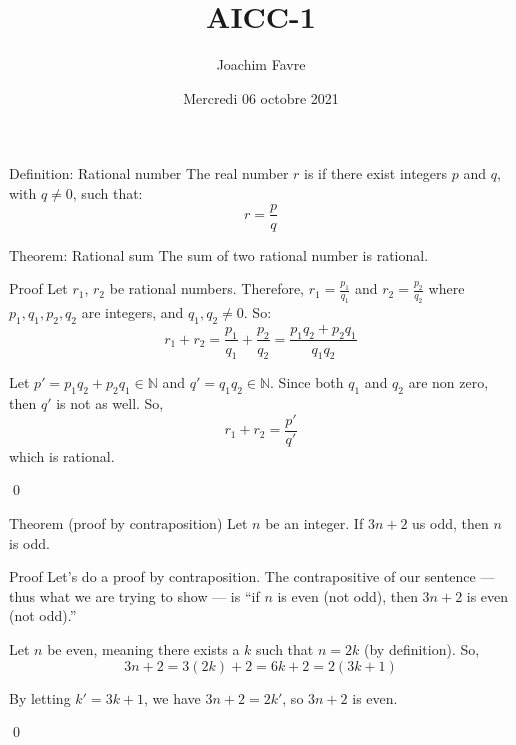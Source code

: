 \documentclass{article}
\title{AICC-1}
\author{Joachim Favre}
\date{Mercredi 06 octobre 2021}
\begin{document}
\maketitle


\begin{parag}{Definition: Rational number}
    The real number $r$ is  if there exist integers $p$ and $q$, with $q \neq 0$, such that: 
    \[r = \frac{p}{q}\]
\end{parag}

\begin{parag}{Theorem: Rational sum}
    The sum of two rational number is rational.

    \begin{subparag}{Proof}
        Let $r_1$, $r_2$ be rational numbers. Therefore, $r_1 = \frac{p_1}{q_1}$ and $r_2 = \frac{p_2}{q_2}$ where $p_1, q_1, p_2, q_2$ are integers, and $q_1, q_2 \neq 0$. So: 
        \[r_1 + r_2 = \frac{p_1}{q_1} + \frac{p_2}{q_2} = \frac{p_1 q_2 + p_2 q_1}{q_1 q_2}\]
        
        Let $p' = p_1 q_2 + p_2 q_1 \in \mathbb{N}$ and $q' = q_1 q_2 \in \mathbb{N}$. Since both $q_1$ and $q_2$ are non zero, then $q'$ is not as well. So, 
        \[r_1 + r_2 = \frac{p'}{q'}\]
        which is rational.

        \qed
    \end{subparag}
\end{parag}

\begin{parag}{Theorem (proof by contraposition)}
    Let $n$ be an integer. If $3n + 2$ us odd, then $n$ is odd.

    \begin{subparag}{Proof}
        Let's do a proof by contraposition. The contrapositive of our sentence --- thus what we are trying to show --- is ``if $n$ is even (not odd), then $3n + 2$ is even (not odd).''

        Let $n$ be even, meaning there exists a $k$ such that $n = 2k$ (by definition). So, 
        \[3n + 2 = 3\left(2k\right) + 2 = 6k + 2 = 2\left(3k + 1\right)\]

        By letting $k' = 3k + 1$, we have $3n + 2 = 2k'$, so $3n + 2$ is even.

        \qed
    \end{subparag}
\end{parag}
\end{document}

